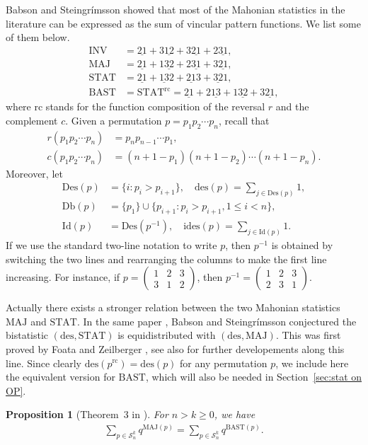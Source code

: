\documentclass[12pt]{amsart}
\numberwithin{equation}{section}
\theoremstyle{plain}
\newtheorem{proposition}[theorem]{Proposition}
\theoremstyle{definition}
\def\INV{\mathrm{INV}}
\def\MAJ{\mathrm{MAJ}}
\def\MAK{\mathrm{MAK}}
\def\STAT{\mathrm{STAT}}
\def\BAST{\mathrm{BAST}}
\def\des{\mathrm{des}}
\def\ides{\mathrm{ides}}
\def\rc{\mathrm{rc}}
\def\Des{\mathrm{Des}}
\def\Db{\mathrm{Db}}
\def\Id{\mathrm{Id}}
\def\SS{\mathcal{S}}
\begin{document}
  Babson and Steingr\'{i}msson \cite{BS} showed that most of the Mahonian statistics in the literature can be expressed as the sum of vincular pattern functions. We list some of them below.
\begin{align*}
\INV &=\underline{21}+3\underline{12}+3\underline{21}+2\underline{31},\\
\MAJ &=\underline{21}+1\underline{32}+2\underline{31}+3\underline{21},\\
\STAT &=\underline{21}+\underline{13}2+\underline{21}3+\underline{32}1,\\
\BAST &=\STAT^{\rc}=\underline{21}+2\underline{13}+1\underline{32}+3\underline{21},
\end{align*}
where $\rc$ stands for the function composition of the reversal $r$ and the complement $c$. Given a permutation $p=p_1 p_2 \cdots p_n$, recall that
\begin{align*}
r(p_1p_2\cdots p_n) &=p_np_{n-1}\cdots p_1,\\
c(p_1p_2\cdots p_n) &=(n+1-p_1)(n+1-p_2)\cdots(n+1-p_n).
\end{align*}
Moreover, let
\begin{align*}
\Des(p)&=\{i:p_i > p_{i+1}\}, \quad \des(p)= \sum_{j\in \Des(p)}1,\\[3pt]
\Db(p)&=\{p_1\}\cup\{p_{i+1}:p_i>p_{i+1}, 1\leq i<n\},\\[3pt]
\Id(p)&= \Des(p^{-1}), \quad
\ides(p) = \sum_{j\in \Id(p)}1.
\end{align*}
If we use the standard two-line notation to write $p$, then $p^{-1}$ is obtained by switching the two lines and rearranging the columns to make the first line increasing. For instance, if $p=\left(\begin{array}{ccc} 1 & 2 & 3\\ 3 & 1 & 2\end{array}\right)$, then $p^{-1}=\left(\begin{array}{ccc} 1 & 2 & 3\\ 2 & 3 & 1 \end{array}\right)$.

Actually there exists a stronger relation between the two Mahonian statistics $\MAJ$ and $\STAT$. In the same paper \cite{BS}, Babson and Steingr\'{i}msson conjectured the bistatistic $(\des,\STAT)$ is equidistributed with $(\des,\MAJ)$. This was first proved by Foata and Zeilberger \cite{FZ}, see also \cite{Bur,KV,CL,FHV} for further developements along this line. Since clearly $\des(p^{\rc})=\des(p)$ for any permutation $p$, we include here the equivalent version for $\BAST$, which will also be needed in Section~\ref{sec:stat on OP}.
\begin{proposition}[Theorem~3 in \cite{FZ}]
For $n>k\ge 0$, we have
\begin{align}
\label{des-maj=des-bast}
\sum_{p\in\SS_n^k}q^{\MAJ(p)}=\sum_{p\in\SS_n^k}q^{\BAST(p)}.
\end{align}
\end{proposition}
\end{document}
